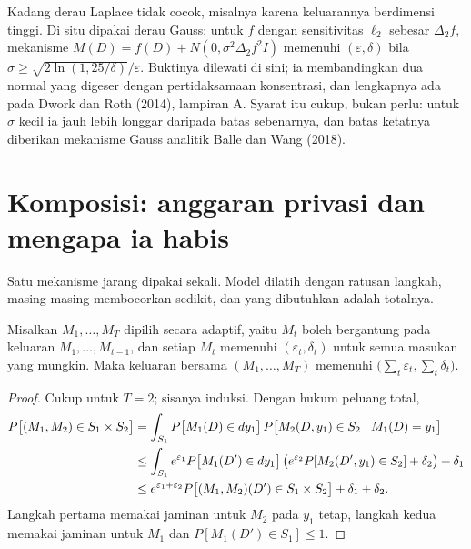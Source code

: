 
Kadang derau Laplace tidak cocok, misalnya karena keluarannya berdimensi tinggi. Di situ
dipakai derau Gauss: untuk $f$ dengan sensitivitas $\ell_2$ sebesar $\Delta_2 f$,
mekanisme $M(D)=f(D)+N(0,\sigma^{2}\Delta_2 f^{2}I)$ memenuhi $(\varepsilon,\delta)$
bila $\sigma\ge\sqrt{2\ln(1{,}25/\delta)}/\varepsilon$. Buktinya dilewati di sini; ia
membandingkan dua normal yang digeser dengan pertidaksamaan konsentrasi, dan lengkapnya
ada pada Dwork dan Roth (2014), lampiran A. Syarat itu cukup, bukan perlu: untuk $\sigma$ kecil ia jauh lebih longgar
daripada batas sebenarnya, dan batas ketatnya diberikan mekanisme Gauss analitik Balle
dan Wang (2018).

\section{Komposisi: anggaran privasi dan mengapa ia habis}

Satu mekanisme jarang dipakai sekali. Model dilatih dengan ratusan langkah, masing-masing
membocorkan sedikit, dan yang dibutuhkan adalah totalnya.

\begin{teorema}
Misalkan $M_1,\dots,M_T$ dipilih secara adaptif, yaitu $M_t$ boleh bergantung pada
keluaran $M_1,\dots,M_{t-1}$, dan setiap $M_t$ memenuhi $(\varepsilon_t,\delta_t)$
untuk semua masukan yang mungkin. Maka keluaran bersama $(M_1,\dots,M_T)$ memenuhi
$\bigl(\sum_t\varepsilon_t,\sum_t\delta_t\bigr)$.
\end{teorema}

\begin{proof}
Cukup untuk $T=2$; sisanya induksi. Dengan hukum peluang total,
\begin{align}
P\bigl[(M_1,M_2)\in S_1\times S_2\bigr]
&= \int_{S_1} P\bigl[M_1(D)\in dy_1\bigr]\,
   P\bigl[M_2(D,y_1)\in S_2 \mid M_1(D)=y_1\bigr] \notag\\
&\le \int_{S_1} e^{\varepsilon_1}P\bigl[M_1(D')\in dy_1\bigr]\,
   \bigl(e^{\varepsilon_2}P[M_2(D',y_1)\in S_2]+\delta_2\bigr) + \delta_1 \notag\\
&\le e^{\varepsilon_1+\varepsilon_2}P\bigl[(M_1,M_2)(D')\in S_1\times S_2\bigr]
   + \delta_1 + \delta_2 .
\end{align}
Langkah pertama memakai jaminan untuk $M_2$ pada $y_1$ tetap, langkah kedua memakai
jaminan untuk $M_1$ dan $P[M_1(D')\in S_1]\le 1$.
\end{proof}

